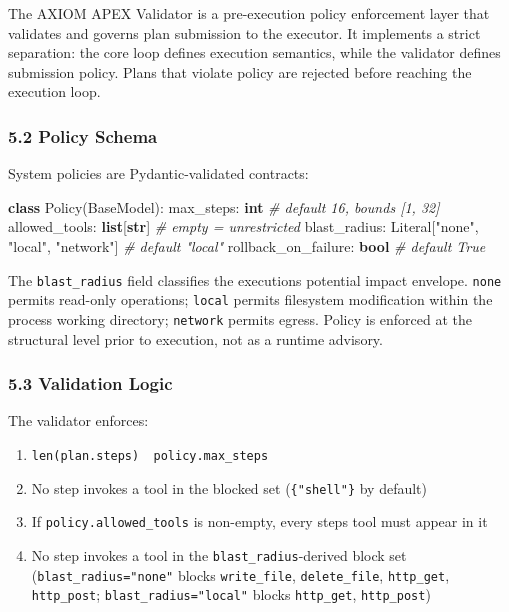 \documentclass[
]{article}
\newenvironment{Shaded}{}{}
\newcommand{\BuiltInTok}[1]{\textcolor[rgb]{0.00,0.50,0.00}{\textbf{#1}}}
\newcommand{\CommentTok}[1]{\textcolor[rgb]{0.38,0.63,0.69}{\textit{#1}}}
\newcommand{\KeywordTok}[1]{\textcolor[rgb]{0.00,0.44,0.13}{\textbf{#1}}}
\newcommand{\NormalTok}[1]{#1}
\newcommand{\StringTok}[1]{\textcolor[rgb]{0.25,0.44,0.63}{#1}}
\providecommand{\tightlist}{%
  \setlength{\itemsep}{0pt}\setlength{\parskip}{0pt}}
\begin{document}
The AXIOM APEX Validator is a pre-execution policy enforcement layer that
validates and governs plan submission to the executor. It implements a strict
separation: the core loop defines execution semantics, while the validator
defines submission policy. Plans that violate policy are rejected before
reaching the execution loop.

\subsubsection{5.2 Policy Schema}\label{52-policy-schema}

System policies are Pydantic-validated contracts:

\begin{Shaded}
\begin{Highlighting}[]
\KeywordTok{class}\NormalTok{ Policy(BaseModel):}
\NormalTok{    max\_steps: }\BuiltInTok{int}          \CommentTok{\# default 16, bounds [1, 32]}
\NormalTok{    allowed\_tools: }\BuiltInTok{list}\NormalTok{[}\BuiltInTok{str}\NormalTok{] }\CommentTok{\# empty = unrestricted}
\NormalTok{    blast\_radius: Literal[}\StringTok{"none"}\NormalTok{, }\StringTok{"local"}\NormalTok{, }\StringTok{"network"}\NormalTok{]  }\CommentTok{\# default "local"}
\NormalTok{    rollback\_on\_failure: }\BuiltInTok{bool}  \CommentTok{\# default True}
\end{Highlighting}
\end{Shaded}

The \texttt{blast\_radius} field classifies the
execution\textquotesingle s potential impact envelope. \texttt{none}
permits read-only operations; \texttt{local} permits filesystem
modification within the process working directory; \texttt{network}
permits egress. Policy is enforced at the structural level prior to
execution, not as a runtime advisory.

\subsubsection{5.3 Validation Logic}\label{53-validation-logic}

The validator enforces:

\begin{enumerate}
\def\labelenumi{\arabic{enumi}.}
\tightlist
\item
  \texttt{len(plan.steps)\ \le\ policy.max\_steps}
\item
  No step invokes a tool in the blocked set (\texttt{\{"shell"\}} by
  default)
\item
  If \texttt{policy.allowed\_tools} is non-empty, every
  step\textquotesingle s tool must appear in it
\item
  No step invokes a tool in the \texttt{blast\_radius}-derived block set
  (\texttt{blast\_radius="none"} blocks \texttt{write\_file},
  \texttt{delete\_file}, \texttt{http\_get}, \texttt{http\_post};
  \texttt{blast\_radius="local"} blocks \texttt{http\_get},
  \texttt{http\_post})
\end{enumerate}
\end{document}
